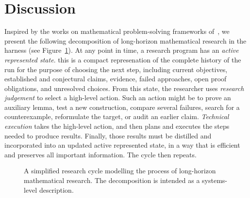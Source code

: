 \section{Discussion}
\label{sec:ai-discussion}

Inspired by the works on mathematical problem-solving frameworks of~\cite{carlson2005problemsolving, schoenfeld1983episodes}, we present the following decomposition of long-horizon mathematical
research in the harness (see Figure~\ref{fig:research-cycle}). At any point in time, a research program has an \emph{active represented state}. this is a compact represenation of the complete history of the run for the purpose of choosing the next step, including current objectives, established and conjectural claims, evidence, failed approaches, open proof obligations, and unresolved choices. From this state, the
researcher uses \emph{research judgement} to select a high-level action. Such
an action might be to prove an auxiliary lemma, test a new construction,
compare several failures, search for a counterexample, reformulate the target,
or audit an earlier claim. \emph{Technical execution} takes the high-level action, and then plans and executes the steps needed to produce results. Finally, those results must be distilled and incorporated into
an updated active represented state, in a way that is efficient and preserves all important information. The cycle then repeats.

\begin{figure}[t]
  \centering
  \caption{A simplified research cycle modelling the process of long-horizon
  mathematical research. The decomposition is intended as a systems-level
  description.}
  \label{fig:research-cycle}
\end{figure}

